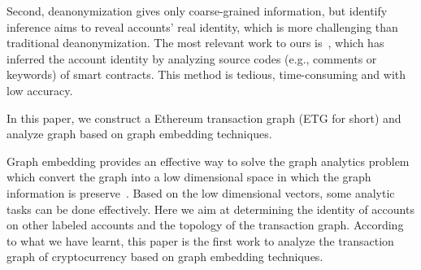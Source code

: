 Second, deanonymization gives only coarse-grained information, but identify inference aims to reveal accounts' real identity, which is more challenging than traditional deanonymization. The most relevant work to ours is~\cite{chen2018infocom}, which has inferred the account identity by analyzing source codes (e.g., comments or keywords) of smart contracts. This method is tedious, time-consuming and with low accuracy.



 In this paper, we construct a Ethereum transaction graph (ETG for short) and analyze graph based on graph embedding techniques.

 Graph embedding provides an effective way to solve the graph analytics problem which convert the graph into a low dimensional space in which the graph information is preserve~\cite{cai2018comprehensive}. Based on the low dimensional vectors, some analytic tasks can be done effectively. Here we aim at determining the identity of accounts on other labeled accounts and the topology of the transaction graph. According to what we have learnt, this paper is the first work to analyze the transaction graph of cryptocurrency based on graph embedding techniques.

